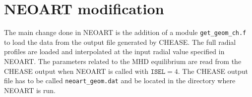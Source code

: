 \documentclass[a4paper,12pt]{article}
\begin{document}
\section{NEOART modification}
The main change done in NEOART is the addition of a module \texttt{get\_geom\_ch.f} to load the data from the output file generated by CHEASE.
The full radial profiles are loaded and interpolated at the input radial value specified in NEOART.
The parameters related to the MHD equilibrium are read from the CHEASE output when NEOART is called with $\texttt{ISEL}=4$. The CHEASE output file has to be called \texttt{neoart\_geom.dat} and be
located in the directory where NEOART is run.
\end{document}
